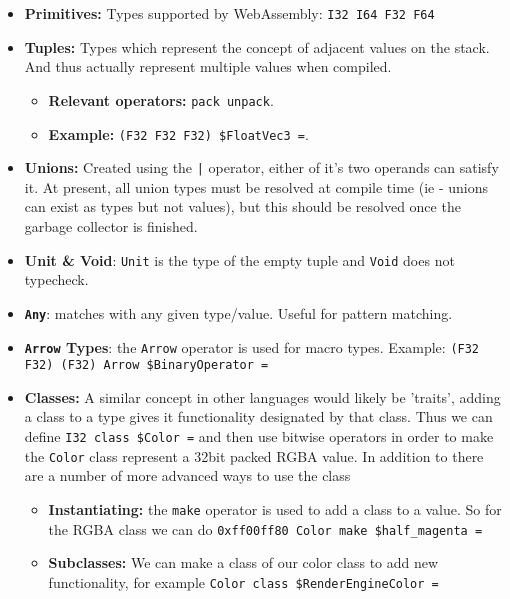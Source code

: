 \documentclass{article}
\begin{document}
\begin{itemize}
    \item \textbf{Primitives:} Types supported by WebAssembly: \texttt{I32 I64 F32 F64}
    \item \textbf{Tuples:} Types which represent the concept of adjacent values on the stack. And thus actually represent multiple values when compiled.
    \begin{itemize}
        \item \textbf{Relevant operators:} \texttt{pack unpack}.
        \item \textbf{Example:} \texttt{(F32 F32 F32) \$FloatVec3 =}.
    \end{itemize}

    \item \textbf{Unions:} Created using the \texttt{|} operator, either of it's two operands can satisfy it. At present, all union types must be resolved at compile time (ie - unions can exist as types but not values), but this should be resolved once the garbage collector is finished.

    \item \textbf{Unit \& Void}: \texttt{Unit} is the type of the empty tuple and \texttt{Void} does not typecheck.

    \item \textbf{\texttt{Any}}: matches with any given type/value. Useful for pattern matching.

    \item \textbf{\texttt{Arrow} Types}: the \texttt{Arrow} operator is used for macro types. 
    Example: \texttt{(F32 F32) (F32) Arrow \$BinaryOperator =}

    \item \textbf{Classes:} A similar concept in other languages would likely be 'traits', adding a class to a type gives it functionality designated by that class. Thus we can define \texttt{I32 class \$Color =} and then use bitwise operators in order to make the \texttt{Color} class represent a 32bit packed RGBA value. In addition to there are a number of more advanced ways to use the class

    \begin{itemize}
        \item \textbf{Instantiating:} the \texttt{make} operator is used to add a class to a value. So for the RGBA class we can do \texttt{0xff00ff80 Color make \$half\_magenta =}

        \item \textbf{Subclasses:} We can make a class of our color class to add new functionality, for example \texttt{Color class \$RenderEngineColor =}


\end{itemize}
\end{itemize}
\end{document}
